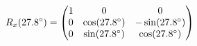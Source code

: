 \documentclass[preview]{standalone}
\begin{document}
\begin{align*}
\special{dvisvgm:raw <g id='unique000'>}R_x(27.8^\circ) = \begin{pmatrix} 1 & 0 & 0 \\ 0 & \cos(27.8^\circ) & -\sin(27.8^\circ) \\ 0 & \sin(27.8^\circ) & \cos(27.8^\circ) \end{pmatrix}\special{dvisvgm:raw </g>}
\end{align*}
\end{document}
